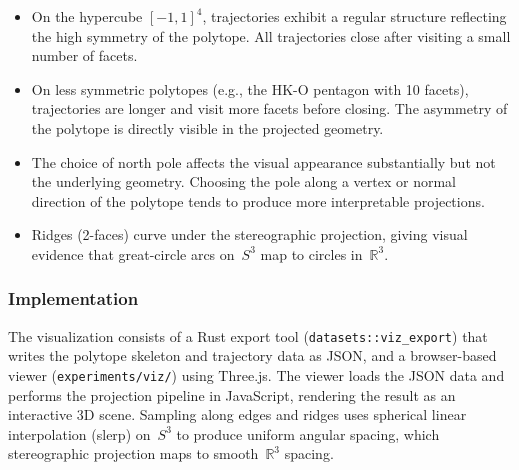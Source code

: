 \begin{itemize}
  \item On the hypercube $[-1,1]^4$, trajectories exhibit a regular
    structure reflecting the high symmetry of the polytope.
    All trajectories close after visiting a small number of facets.

  \item On less symmetric polytopes (e.g., the HK-O pentagon with 10
    facets), trajectories are longer and visit more facets before
    closing. The asymmetry of the polytope is directly visible in the
    projected geometry.

  \item The choice of north pole affects the visual appearance
    substantially but not the underlying geometry.
    Choosing the pole along a vertex or normal direction
    of the polytope tends to produce more interpretable projections.

  \item Ridges (2-faces) curve under the stereographic projection,
    giving visual evidence that great-circle arcs on~$S^3$ map to
    circles in~$\mathbb{R}^3$.
\end{itemize}

\subsubsection*{Implementation}

The visualization consists of a Rust export tool
(\texttt{datasets::viz\_export}) that writes the polytope skeleton
and trajectory data as JSON, and a browser-based viewer
(\texttt{experiments/viz/}) using Three.js.
The viewer loads the JSON data and performs the projection pipeline
in JavaScript, rendering the result as an interactive 3D scene.
Sampling along edges and ridges uses spherical linear interpolation
(slerp) on~$S^3$ to produce uniform angular spacing, which
stereographic projection maps to smooth~$\mathbb{R}^3$ spacing.
